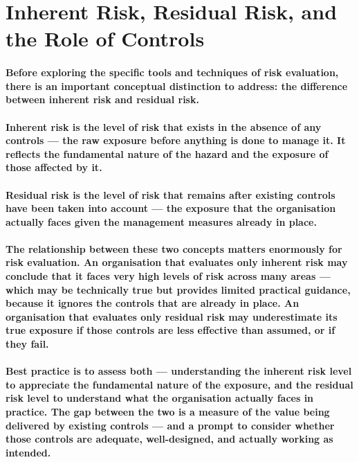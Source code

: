 \section{Inherent Risk, Residual Risk, and the Role of Controls}
\paragraph{Before exploring the specific tools and techniques of risk evaluation, there is an important conceptual distinction to address: the difference between \textbf{inherent risk} and \textbf{residual risk}.}
\paragraph{\textbf{Inherent risk} is the level of risk that exists in the absence of any controls — the raw exposure before anything is done to manage it. It reflects the fundamental nature of the hazard and the exposure of those affected by it.}
\paragraph{\textbf{Residual risk} is the level of risk that remains after existing controls have been taken into account — the exposure that the organisation actually faces given the management measures already in place.}
\paragraph{The relationship between these two concepts matters enormously for risk evaluation. An organisation that evaluates only inherent risk may conclude that it faces very high levels of risk across many areas — which may be technically true but provides limited practical guidance, because it ignores the controls that are already in place. An organisation that evaluates only residual risk may underestimate its true exposure if those controls are less effective than assumed, or if they fail.}
\paragraph{Best practice is to assess both — understanding the inherent risk level to appreciate the fundamental nature of the exposure, and the residual risk level to understand what the organisation actually faces in practice. The gap between the two is a measure of the value being delivered by existing controls — and a prompt to consider whether those controls are adequate, well-designed, and actually working as intended.}
